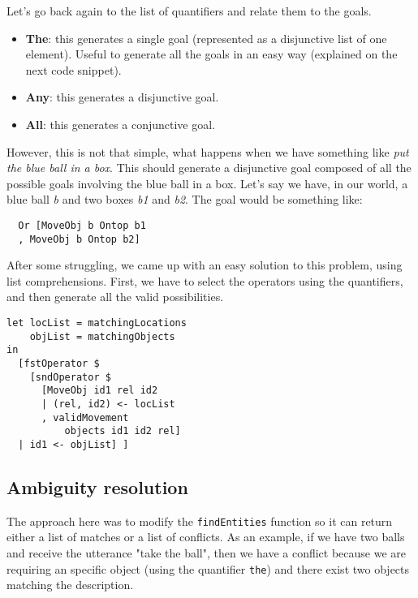 \documentclass[11pt]{article}
\begin{document}
          Let's go back again to the list of quantifiers and relate them to the goals.

          \begin{itemize}
            \item {\bf The}: this generates a single goal (represented as a disjunctive
            list of one element). Useful to generate all the goals in an easy way
            (explained on the next code snippet).
            \item {\bf Any}: this generates a disjunctive goal.
            \item {\bf All}: this generates a conjunctive goal.
          \end{itemize}

          However, this is not that simple, what happens when we have something like 
          \textit{put the blue ball in a box}. This should generate a disjunctive goal
          composed of all the possible goals involving the blue ball in a box. Let's say
          we have, in our world, a blue ball \textit{b} and two boxes \textit{b1} and \textit{b2}. The goal would be something like:

\begin{verbatim}
  Or [MoveObj b Ontop b1
  , MoveObj b Ontop b2]
\end{verbatim}

          After some struggling, we came up with an easy solution to this problem, using list comprehensions.
          First, we have to select the operators using the quantifiers, and then generate all the valid possibilities.

\begin{verbatim}
let locList = matchingLocations
    objList = matchingObjects
in
  [fstOperator $
    [sndOperator $ 
      [MoveObj id1 rel id2
      | (rel, id2) <- locList
      , validMovement 
          objects id1 id2 rel]
  | id1 <- objList] ]
\end{verbatim}
	
        \subsection{Ambiguity resolution}
          The approach here was to modify the \texttt{findEntities} function so it can return
           either a list of matches or a list of conflicts. As an example, if we have two 
           balls and receive the utterance "take the ball", then we have a conflict because 
           we are requiring an specific object (using the quantifier \texttt{the}) and there
           exist two objects matching the description.
\end{document}
